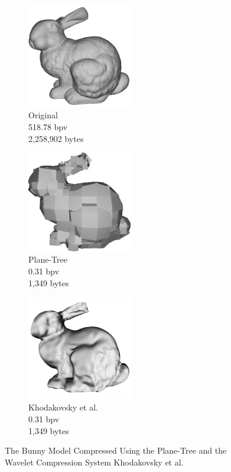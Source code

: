 \begin{figure}[H] 
        \begin{center}
 		\begin{subfigure}[b]{2in}
 			   \centering
 			   \includegraphics[width=1.8in]{images/experiments/pt_qual/original2}
				\captionsetup{justification=centering}
                \caption{Original\\518.78 bpv\\2,258,902 bytes}
                \label{fig:PT_SOTAQ2_ORIG}
        \end{subfigure}%
        \begin{subfigure}[b]{2in}
                \includegraphics[width=1.8in]{images/experiments/pt_qual/planetree2_shade}
                \captionsetup{justification=centering}
                \caption{Plane-Tree\\0.31 bpv\\1,349 bytes}
                \label{fig:PT_SOTAQ1_PLT}
        \end{subfigure}%
        \begin{subfigure}[b]{2in}
                \includegraphics[width=1.8in]{images/experiments/pt_qual/khodakovsky_shade}
                \captionsetup{justification=centering}
                \caption{Khodakovsky et al. \cite{Khodakovsky00Progressive}\\0.31 bpv\\1,349 bytes}
                \label{fig:PT_SOTAQ1_KHKY}
        \end{subfigure}
       \caption{The Bunny Model Compressed Using the Plane-Tree and the Wavelet Compression System Khodakovsky et al.}
       \label{fig:qualSOTA2}
       \end{center}
\end{figure}

